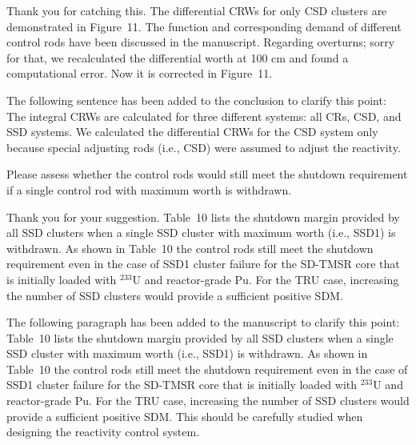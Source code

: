 \documentclass[answers,11pt]{exam}
\begin{document}
\begin{questions}
\begin{solution}
	Thank you for catching this. The differential CRWs for only CSD clusters are demonstrated in Figure~11. The function and corresponding demand of different control rods have been discussed in the manuscript. Regarding overturns; sorry for that, we recalculated the differential worth at 100 cm and found a computational error. Now it is corrected in Figure~11. 	
	
	The following sentence has been added to the conclusion to clarify this point:\\
	
The integral CRWs are calculated for three different systems: all CRs, CSD, and SSD systems. We calculated the differential CRWs for the CSD system only because special adjusting rods (i.e., CSD) were assumed to adjust the reactivity.
	
	
\end{solution}

\question Please assess whether the control rods would still meet the shutdown requirement if a single control rod with maximum worth is withdrawn.
\begin{solution}
	
	Thank you for your suggestion. Table~10 lists the shutdown margin provided by all SSD clusters when a single SSD cluster with maximum worth (i.e., SSD1) is withdrawn. As shown in Table~10 the control rods still meet the shutdown requirement even in the case of SSD1 cluster failure for the SD-TMSR core that is initially loaded with $^{233}$U and reactor-grade Pu. For the TRU case, increasing the number of SSD clusters would provide a sufficient positive SDM.
	
		The following paragraph has been added to the manuscript to clarify this point:\\
	
	Table~10 lists the shutdown margin provided by all SSD clusters when a single SSD cluster with maximum worth (i.e., SSD1) is withdrawn. As shown in Table~10 the control rods still meet the shutdown requirement even in the case of SSD1 cluster failure for the SD-TMSR core that is initially loaded with $^{233}$U and reactor-grade Pu. For the TRU case, increasing the number of SSD clusters would provide a sufficient positive SDM. This should be carefully studied when designing the reactivity control system. 
	
	
\end{solution}


\end{questions}
\end{document}
